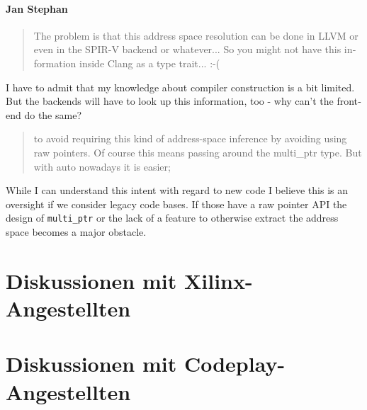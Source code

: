 \begin{otherlanguage}{english}
    \paragraph{Jan Stephan} \begin{quote}
                                The problem is that this address space
                                resolution can be done in LLVM or even in the
                                SPIR-V backend or whatever... So you might not
                                have this information inside Clang as a type
                                trait... :-(
                            \end{quote}
                            I have to admit that my knowledge about compiler
                            construction is a bit limited. But the backends will
                            have to look up this information, too - why can't
                            the frontend do the same?
                            \begin{quote}
                                to avoid requiring this kind of address-space
                                inference by avoiding using raw pointers. Of
                                course this means passing around the
                                multi\_ptr type. But with auto nowadays it is
                                easier;
                            \end{quote}
                            While I can understand this intent with regard to
                            new code I believe this is an oversight if we
                            consider legacy code bases. If those have a raw
                            pointer API the design of \texttt{multi\_ptr} or
                            the lack of a feature to otherwise extract the
                            address space becomes a major obstacle.
\end{otherlanguage}

\section{Diskussionen mit Xilinx-Angestellten}

\section{Diskussionen mit Codeplay-Angestellten}
